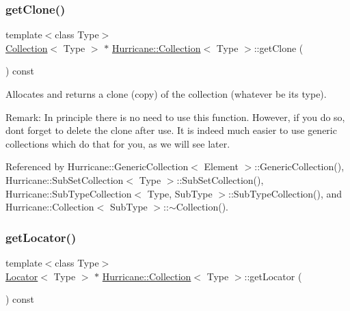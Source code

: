 \subsubsection{\texorpdfstring{get\+Clone()}{getClone()}}
{\footnotesize\ttfamily template$<$class Type$>$ \\
\hyperlink{classHurricane_1_1Collection}{Collection}$<$ Type $>$ $\ast$ \hyperlink{classHurricane_1_1Collection}{Hurricane\+::\+Collection}$<$ Type $>$\+::get\+Clone (\begin{DoxyParamCaption}{ }\end{DoxyParamCaption}) const\hspace{0.3cm}{\ttfamily [pure virtual]}}

Allocates and returns a clone (copy) of the collection (whatever be its type).

\begin{DoxyParagraph}{Remark\+:}
In principle there is no need to use this function. However, if you do so, don\textquotesingle{}t forget to delete the clone after use. It is indeed much easier to use generic collections which do that for you, as we will see later. 
\end{DoxyParagraph}


Referenced by Hurricane\+::\+Generic\+Collection$<$ Element $>$\+::\+Generic\+Collection(), Hurricane\+::\+Sub\+Set\+Collection$<$ Type $>$\+::\+Sub\+Set\+Collection(), Hurricane\+::\+Sub\+Type\+Collection$<$ Type, Sub\+Type $>$\+::\+Sub\+Type\+Collection(), and Hurricane\+::\+Collection$<$ Sub\+Type $>$\+::$\sim$\+Collection().

\mbox{\label{classHurricane_1_1Collection_a48fd1a0a2b6d2530a87e22ba65aa3152}} 
\subsubsection{\texorpdfstring{get\+Locator()}{getLocator()}}
{\footnotesize\ttfamily template$<$class Type$>$ \\
\hyperlink{classHurricane_1_1Locator}{Locator}$<$ Type $>$ $\ast$ \hyperlink{classHurricane_1_1Collection}{Hurricane\+::\+Collection}$<$ Type $>$\+::get\+Locator (\begin{DoxyParamCaption}{ }\end{DoxyParamCaption}) const\hspace{0.3cm}{\ttfamily [pure virtual]}}

